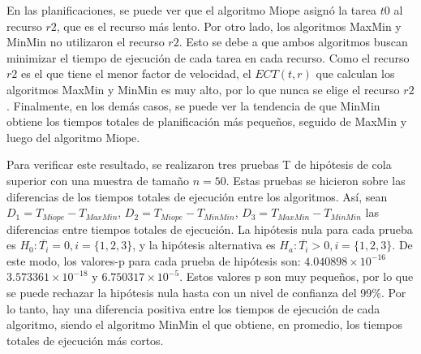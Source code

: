 En las planificaciones, se puede ver que el algoritmo Miope asignó la tarea $t0$ al recurso $r2$, que es el recurso más lento. Por otro lado, los algoritmos MaxMin y MinMin no utilizaron el recurso $r2$. Esto se debe a que ambos algoritmos buscan minimizar el tiempo de ejecución de cada tarea en cada recurso. Como el recurso $r2$ es el que tiene el menor factor de velocidad, el $ECT(t,r)$ que calculan los algoritmos MaxMin y MinMin es muy alto, por lo que nunca se elige el recurso $r2$. Finalmente, en los demás casos, se puede ver la tendencia de que MinMin obtiene los tiempos totales de planificación más pequeños, seguido de MaxMin y luego del algoritmo Miope. 

Para verificar este resultado, se realizaron tres pruebas T de hipótesis de cola superior con una muestra de tamaño $n=50$. Estas pruebas se hicieron sobre las diferencias de los tiempos totales de ejecución entre los algoritmos. Así, sean $D_1 = T_{Miope} - T_{MaxMin}$, $D_2 = T_{Miope} - T_{MinMin}$, $D_3 = T_{MaxMin} - T_{MinMin}$ las diferencias entre tiempos totales de ejecución. La hipótesis nula para cada prueba es $H_0: \overline{T_i} = 0, i=\{1,2,3\}$, y la hipótesis alternativa es $H_a: \overline{T_i} > 0, i=\{1,2,3\}$. De este modo, los valores-p para cada prueba de hipótesis son: $4.040898 \times 10^{-16}$ $3.573361 \times 10^{-18}$ y $6.750317 \times 10^{-5}$. Estos valores p son muy pequeños, por lo que se puede rechazar la hipótesis nula hasta con un nivel de confianza del 99\%. Por lo tanto, hay una diferencia positiva entre los tiempos de ejecución de cada algoritmo, siendo el algoritmo MinMin el que obtiene, en promedio, los tiempos totales de ejecución más cortos.

